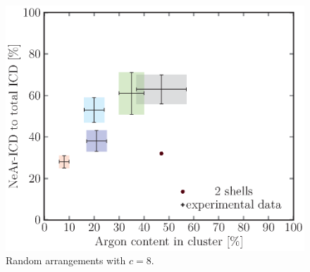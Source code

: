 \begin{figure}[!h]
\begin{minipage}{0.48\textwidth}
    \centering
    \includegraphics[scale=0.5]{pics/random08.ps}
    \caption{Random arrangements with $c=8$.}
    \label{random08}
\end{minipage}
\hfill
\begin{minipage}{0.48\textwidth}
    \centering
\end{minipage}
\end{figure}

